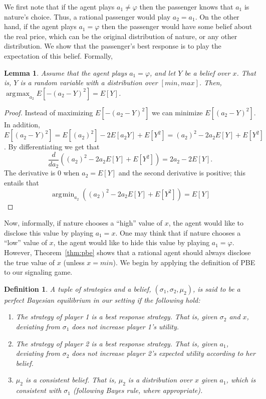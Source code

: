 \documentclass[letterpaper]{article} %
\DeclareMathOperator*{\argmin}{\arg\!\min}
\DeclareMathOperator*{\argmax}{\arg\!\max}
\newtheorem{definition}{Definition}
\newtheorem{lemma}{Lemma}
\begin{document}
We first note that if the agent plays $a_1 \neq \varphi$ then the passenger knows that $a_1$ is nature's choice. Thus, a rational passenger would play $a_2=a_1$. On the other hand, if the agent plays $a_1=\varphi$ then the passenger would have some belief about the real price, which can be the original distribution of nature, or any other distribution. We show that the passenger's best response is to play the expectation of this belief. Formally, 
\begin{lemma}
\label{lemma:belief}
Assume that the agent plays $a_1=\varphi$, and let $Y$ be a belief over $x$. That is, $Y$ is a random variable with a distribution over $[min,max]$. Then, $\argmax_{a_2} E[-(a_2-Y)^2] = E[Y]$. \end{lemma}
\begin{proof}
Instead of maximizing $E[-(a_2-Y)^2]$ we can minimize $E[(a_2-Y)^2]$. In addition, $E[(a_2-Y)^2] = E[(a_2)^2] -2E[a_2 Y] + E[Y^2] = (a_2)^2 -2a_2 E[Y] + E[Y^2]$. By differentiating we get that
\[ \frac d {da_2} \left((a_2)^2 -2a_2 E[Y] + E[Y^2]\right) = 2a_2 -2E[Y].\]
The derivative is $0$ when $a_2 = E[Y]$ and the second derivative is positive; this entails that
\[\argmin_{a_2} \left((a_2)^2 -2a_2 E[Y] + E[Y^2]\right) = E[Y]\]
\end{proof}

Now, informally, if nature chooses a ``high'' value of $x$, the agent would like to disclose this value by playing $a_1=x$. One may think that if nature chooses a ``low'' value of $x$, the agent would like to hide this value by playing $a_1=\varphi$. However, Theorem~\ref{thm:pbe} shows that a rational agent should always disclose the true value of $x$ (unless $x=min$). We begin by applying the definition of PBE to our signaling game.   
\begin{definition}
A tuple of strategies and a belief, $(\sigma_1, \sigma_2, \mu_2)$, is said to be a perfect Bayesian equilibrium in our setting if the following hold:
\begin{enumerate}
    \item The strategy of player 1 is a best response strategy. That is, given $\sigma_2$ and $x$, deviating from $\sigma_1$ does not increase player 1's utility. %
    \item The strategy of player 2 is a best response strategy. That is, given $a_1$, deviating from $\sigma_2$ does not increase player 2's expected utility according to her belief.
    \item $\mu_2$ is a consistent belief.
    That is, $\mu_2$ is a distribution over $x$ given $a_1$, which is consistent with $\sigma_1$ (following Bayes rule, where appropriate).
\end{enumerate}
\end{definition}
\end{document}
